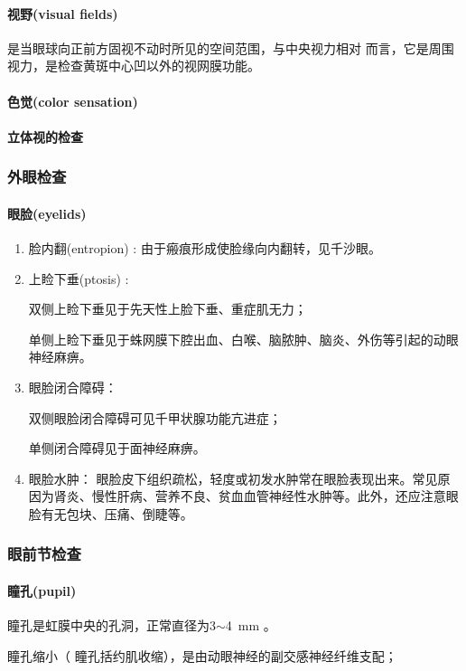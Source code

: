 \documentclass[UTF8]{ctexbook}
\begin{document}
\paragraph{视野(visual fields)} 是当眼球向正前方固视不动时所见的空间范围，与中央视力相对
而言，它是周围视力，是检查黄斑中心凹以外的视网膜功能。

\paragraph{色觉(color sensation)}
\paragraph{立体视的检查}
\subsubsection{外眼检查}
\paragraph{眼脸(eyelids)}
\begin{enumerate}[(1)]
    \item 脸内翻(entropion) : 由于瘢痕形成使脸缘向内翻转，见千沙眼。
    \item 上睑下垂(ptosis) :

          双侧上睑下垂见于先天性上脸下垂、重症肌无力；

          单侧上睑下垂见于蛛网膜下腔出血、白喉、脑脓肿、脑炎、外伤等引起的动眼神经麻痹。
    \item 眼脸闭合障碍：

          双侧眼脸闭合障碍可见千甲状腺功能亢进症；

          单侧闭合障碍见于面神经麻痹。
    \item 眼脸水肿： 眼脸皮下组织疏松，轻度或初发水肿常在眼脸表现出来。常见原因为肾炎、慢性肝病、营养不良、贫血血管神经性水肿等。此外，还应注意眼脸有无包块、压痛、倒睫等。
\end{enumerate}
\subsubsection{眼前节检查}
\paragraph{瞳孔(pupil)}瞳孔是虹膜中央的孔洞，正常直径为3$\sim$4~mm 。

瞳孔缩小（ 瞳孔括约肌收缩），是由动眼神经的副交感神经纤维支配；
\end{document}
